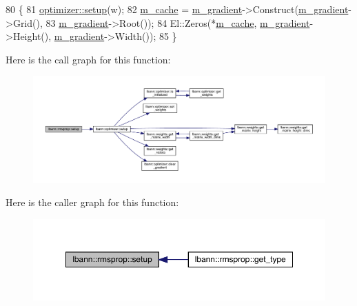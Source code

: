 \begin{DoxyCode}
80                               \{
81   \hyperlink{classlbann_1_1optimizer_a7641a88b3c166df2d974a298622b992b}{optimizer::setup}(w);
82   \hyperlink{classlbann_1_1rmsprop_a2bbaa35bb209e971a5ac9e1dbb6ece76}{m\_cache} = \hyperlink{classlbann_1_1optimizer_a3df20cb0ae2b60430ad4fd235d66c12e}{m\_gradient}->Construct(\hyperlink{classlbann_1_1optimizer_a3df20cb0ae2b60430ad4fd235d66c12e}{m\_gradient}->Grid(),
83                                   \hyperlink{classlbann_1_1optimizer_a3df20cb0ae2b60430ad4fd235d66c12e}{m\_gradient}->Root());
84   El::Zeros(*\hyperlink{classlbann_1_1rmsprop_a2bbaa35bb209e971a5ac9e1dbb6ece76}{m\_cache}, \hyperlink{classlbann_1_1optimizer_a3df20cb0ae2b60430ad4fd235d66c12e}{m\_gradient}->Height(), \hyperlink{classlbann_1_1optimizer_a3df20cb0ae2b60430ad4fd235d66c12e}{m\_gradient}->Width());
85 \}
\end{DoxyCode}
Here is the call graph for this function\+:\nopagebreak
\begin{figure}[H]
\begin{center}
\leavevmode
\includegraphics[width=350pt]{classlbann_1_1rmsprop_a8f6111a36f9ad592d14e13b64a0f228f_cgraph}
\end{center}
\end{figure}
Here is the caller graph for this function\+:\nopagebreak
\begin{figure}[H]
\begin{center}
\leavevmode
\includegraphics[width=350pt]{classlbann_1_1rmsprop_a8f6111a36f9ad592d14e13b64a0f228f_icgraph}
\end{center}
\end{figure}
\mbox{\label{classlbann_1_1rmsprop_a600e4b332299a6aaa36d0b7ff458e3f3}} 
